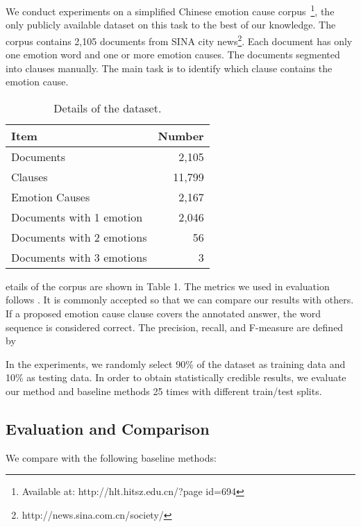 \documentclass[11pt,letterpaper]{article}
\begin{document}
\begin{CJK*}{UTF8}{gbsn}
We conduct experiments on a simplified Chinese emotion cause corpus~\cite{gui2016event}\footnote{Available at: http://hlt.hitsz.edu.cn/?page id=694}, 
the only publicly available dataset on this task to the best of our knowledge. The corpus contains 2,105 documents from SINA city news\footnote{http://news.sina.com.cn/society/}. Each document has only one emotion word and one or more emotion causes. The documents  segmented into clauses manually. The main task is to identify which clause contains the emotion cause.

\begin{table}
\centering
\small
\begin{tabular}{|l|r|}
\hline
{\bf Item} & {\bf Number} \\\hline
Documents & 2,105 \\
Clauses & 11,799 \\
Emotion Causes & 2,167 \\ 
Documents with 1 emotion & 2,046 \\ 
Documents with 2 emotions & 56 \\
Documents with 3 emotions  & 3  \\\hline
\end{tabular} 
\caption{Details of the dataset.}
\end{table}


etails of the corpus are shown in Table 1. The metrics we used in evaluation follows . It is commonly accepted so that we can compare our results with others. If a proposed emotion cause clause covers the annotated answer, the word sequence is considered correct. The precision, recall, and F-measure are defined by



In the experiments, we randomly select 90\% of the dataset as training data and 10\% as testing data. In order to obtain statistically credible results, we evaluate our method and baseline methods 25 times with different train/test splits.

\subsection{Evaluation and Comparison}

We compare with the following baseline methods:


\end{CJK*}
\end{document}
